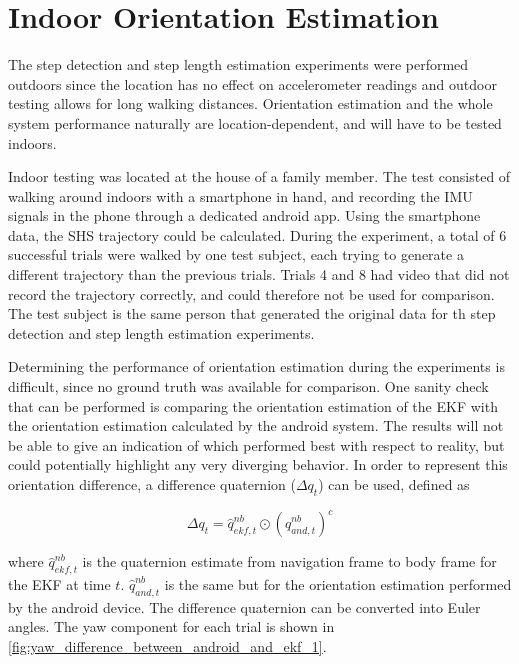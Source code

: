 \section{Indoor Orientation Estimation}

The step detection and step length estimation experiments were performed outdoors since the location has no effect on accelerometer readings and outdoor testing allows for long walking distances. Orientation estimation and the whole system performance naturally are location-dependent, and will have to be tested indoors. \par

Indoor testing was located at the house of a family member. The test consisted of walking around indoors with a smartphone in hand, and recording the IMU signals in the phone through a dedicated android app. Using the smartphone data, the SHS trajectory could be calculated. During the experiment, a total of 6 successful trials were walked by one test subject, each trying to generate a different trajectory than the previous trials. Trials 4 and 8 had video that did not record the trajectory correctly, and could therefore not be used for comparison. The test subject is the same person that generated the original data for th step detection and step length estimation experiments.\par 

Determining the performance of  orientation estimation during the experiments is difficult, since no ground truth was available for comparison. One sanity check that can be performed is comparing the orientation estimation of the EKF with the orientation estimation calculated by the android system. The results will not be able to give an indication of which performed best with respect to reality, but could potentially highlight any very diverging behavior. In order to represent this orientation difference, a difference quaternion ($	\Delta q_t$) can be used, defined as \cite{Kok2017}

\begin{equation}
	\Delta q_t = \hat{q}_{ekf,t}^{nb} \odot \left( \hat{q}_{and,t}^{nb}  \right)^c
\end{equation} 

where $\hat{q}_{ekf,t}^{nb}$ is the quaternion estimate from navigation frame to body frame for the EKF at time $t$. $\hat{q}_{and,t}^{nb}$ is the same but for the orientation estimation performed by the android device. The difference quaternion can be converted into Euler angles. The yaw component for each trial is shown in  \cref{fig:yaw_difference_between_android_and_ekf_1}.

